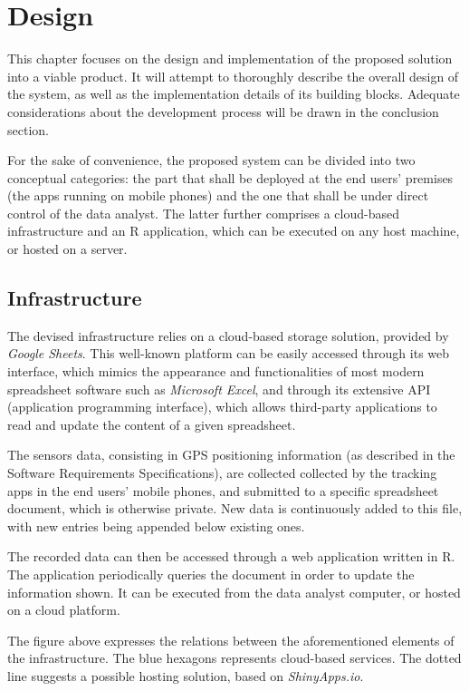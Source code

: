 \chapter{Design}
This chapter focuses on the design and implementation of the proposed solution into a viable product.
It will attempt to thoroughly describe the overall design of the system, as well as the implementation details of its building blocks.
Adequate considerations about the development process will be drawn in the conclusion section.

For the sake of convenience, the proposed system can be divided into two conceptual categories: the part that shall be deployed at the end users' premises (the apps running on mobile phones) and the one that shall be under direct control of the data analyst.
The latter further comprises a cloud-based infrastructure and an R application, which can be executed on any host machine, or hosted on a server.


\section{Infrastructure}
The devised infrastructure relies on a cloud-based storage solution, provided by \emph{Google Sheets}.
This well-known platform can be easily accessed through its web interface, which mimics the appearance and functionalities of most modern spreadsheet software such as \emph{Microsoft Excel}, and through its extensive API (application programming interface), which allows third-party applications to read and update the content of a given spreadsheet.

The sensors data, consisting in GPS positioning information (as described in the Software Requirements Specifications), are collected collected by the tracking apps in the end users' mobile phones, and submitted to a specific spreadsheet document, which is otherwise private.
New data is continuously added to this file, with new entries being appended below existing ones.

The recorded data can then be accessed through a web application written in R.
The application periodically queries the document in order to update the information shown.
It can be executed from the data analyst computer, or hosted on a cloud platform.


The figure above expresses the relations between the aforementioned elements of the infrastructure.
The blue hexagons represents cloud-based services.
The dotted line suggests a possible hosting solution, based on \emph{ShinyApps.io}.



